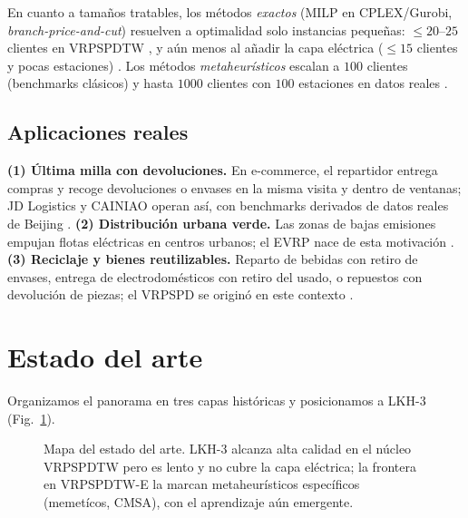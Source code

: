 \documentclass[conference]{IEEEtran}
\begin{document}
En cuanto a tama\~nos tratables, los m\'etodos \emph{exactos} (MILP en
CPLEX/Gurobi, \emph{branch-price-and-cut}) resuelven a optimalidad solo
instancias peque\~nas: $\le 20$--$25$ clientes en VRPSPDTW
\cite{liu2021mate,desaulniers2016exact}, y a\'un menos al a\~nadir la capa
el\'ectrica ($\le 15$ clientes y pocas estaciones)
\cite{akbay2022cmsa,feng2023admm}. Los m\'etodos \emph{metaheur\'isticos}
escalan a $100$ clientes (benchmarks cl\'asicos) y hasta $1000$ clientes con
$100$ estaciones en datos reales \cite{zheng2025hma}.

\subsection{Aplicaciones reales}
\textbf{(1) \'Ultima milla con devoluciones.} En e-commerce, el repartidor
entrega compras y recoge devoluciones o envases en la misma visita y dentro de
ventanas; JD Logistics y CAINIAO operan as\'i, con benchmarks derivados de datos
reales de Beijing \cite{zheng2025hma,liu2021mate}.
\textbf{(2) Distribuci\'on urbana verde.} Las zonas de bajas emisiones empujan
flotas el\'ectricas en centros urbanos; el EVRP nace de esta motivaci\'on
\cite{erdogan2012green,schneider2014evrptw}.
\textbf{(3) Reciclaje y bienes reutilizables.} Reparto de bebidas con retiro de
envases, entrega de electrodom\'esticos con retiro del usado, o repuestos con
devoluci\'on de piezas; el VRPSPD se origin\'o en este contexto
\cite{min1989,dethloff2001,koc2020review}.

\section{Estado del arte}\label{sec:sota}
Organizamos el panorama en tres capas hist\'oricas y posicionamos a LKH-3
(Fig.~\ref{fig:mapa}).

\begin{figure}[t]
  \centering
  \resizebox{0.95\textwidth}{!}{}
  \caption{Mapa del estado del arte. LKH-3 alcanza alta calidad en el n\'ucleo
  VRPSPDTW pero es lento y no cubre la capa el\'ectrica; la frontera en
  VRPSPDTW-E la marcan metaheur\'isticos espec\'ificos (memet\'icos, CMSA), con
  el aprendizaje a\'un emergente.}
  \label{fig:mapa}
\end{figure}
\end{document}
